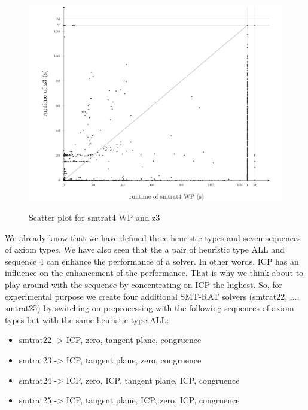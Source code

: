 \begin{figure}[!ht]
    \centering
    \caption{Scatter plot for smtrat4 WP and z3}
    \includegraphics[width=1\linewidth]{./figures/scatter-smtrat_4_preprocessing-z3.pdf}
    \label{fig:Scatter_plot_for_smtrat4_WP_and_z3}
\end{figure}

\noindent We already know that we have defined three heuristic types and seven sequences of axiom types.
We have also seen that the a pair of heuristic type ALL and sequence $4$ can enhance the performance of a solver.
In other words, ICP has an influence on the enhancement of the performance.
That is why we think about to play around with the sequence by concentrating on ICP the highest.
So, for experimental purpose we create four additional SMT-RAT solvers (smtrat22, $\dots$, smtrat25) by switching on preprocessing with the following sequences of axiom types but with the same heuristic type ALL:

\begin{itemize}
    \item smtrat22 -> ICP, zero, tangent plane, congruence
    \item smtrat23 -> ICP, tangent plane, zero, congruence
    \item smtrat24 -> ICP, zero, ICP, tangent plane, ICP, congruence
    \item smtrat25 -> ICP, tangent plane, ICP, zero, ICP, congruence
\end{itemize}

